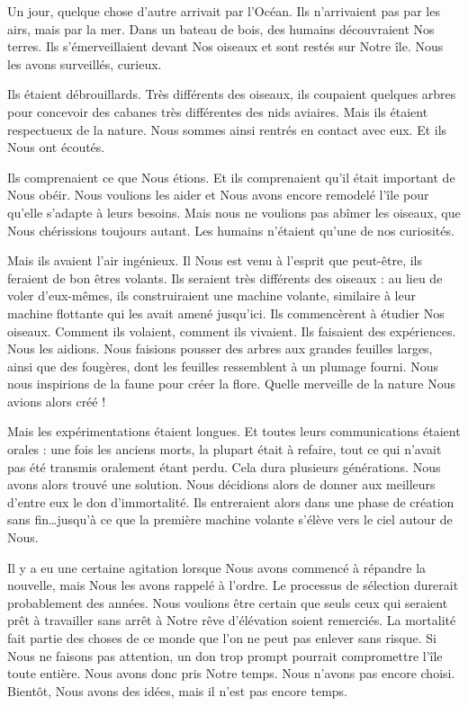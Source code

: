 {        Un jour, quelque chose d’autre arrivait par l’Océan.
        Ils n’arrivaient pas par les airs, mais par la mer.  Dans un bateau de bois, des humains découvraient Nos terres.
        Ils s’émerveillaient devant Nos oiseaux et sont restés sur Notre île.
        Nous les avons surveillés, curieux.

        Ils étaient débrouillards.
        Très différents des oiseaux, ils coupaient quelques arbres pour concevoir des cabanes très différentes des nids aviaires.
        Mais ils étaient respectueux de la nature.
        Nous sommes ainsi rentrés en contact avec eux.  Et ils Nous ont écoutés.

        Ils comprenaient ce que Nous étions.  Et ils comprenaient qu’il était important de Nous obéir.
        Nous voulions les aider et Nous avons encore remodelé l’île pour qu’elle s’adapte à leurs besoins.
        Mais nous ne voulions pas abîmer les oiseaux, que Nous chérissions toujours autant.
        Les humains n’étaient qu’une de nos curiosités.

        Mais ils avaient l’air ingénieux.  Il Nous est venu à l’esprit que peut-être, ils feraient de bon êtres volants.
        Ils seraient très différents des oiseaux :  au lieu de voler d’eux-mêmes, ils construiraient une machine volante, similaire à leur machine flottante qui les avait amené jusqu’ici.
        Ils commencèrent à étudier Nos oiseaux.  Comment ils volaient, comment ils vivaient.
        Ils faisaient des expériences.  Nous les aidions.
        Nous faisions pousser des arbres aux grandes feuilles larges, ainsi que des fougères, dont les feuilles ressemblent à un plumage fourni.
        Nous nous inspirions de la faune pour créer la flore.  Quelle merveille de la nature Nous avions alors créé !

        Mais les expérimentations étaient longues.
        Et toutes leurs communications étaient orales :  une fois les anciens morts, la plupart était à refaire, tout ce qui n’avait pas été transmis oralement étant perdu.
        Cela dura plusieurs générations.  Nous avons alors trouvé une solution.
        Nous décidions alors de donner aux meilleurs d’entre eux le don d’immortalité.
        Ils entreraient alors dans une phase de création sans fin\ldots jusqu’à ce que la première machine volante s’élève vers le ciel autour de Nous.

        Il y a eu une certaine agitation lorsque Nous avons commencé à répandre la nouvelle, mais Nous les avons rappelé à l’ordre.
        Le processus de sélection durerait probablement des années.
        Nous voulions être certain que seuls ceux qui seraient prêt à travailler sans arrêt à Notre rêve d’élévation soient remerciés.
        La mortalité fait partie des choses de ce monde que l’on ne peut pas enlever sans risque.
        Si Nous ne faisons pas attention, un don trop prompt pourrait compromettre l’île toute entière.
        Nous avons donc pris Notre temps.  Nous n’avons pas encore choisi.  Bientôt, Nous avons des idées, mais il n’est pas encore temps.

}
